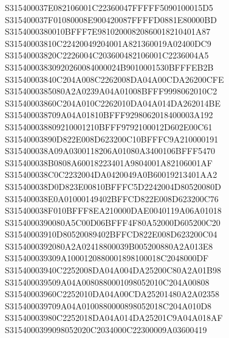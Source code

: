 \documentclass[12pt,a4paper]{article}
\begin{document}
\begin{framed}
{S315400037E082106001C22360047FFFFF5090100015D5\newline
S315400037F01080008E900420087FFFFD0881E80000BD\newline
S3154000380010BFFF7E98102000820860018210401A87\newline
S31540003810C22420049204001A821360019A02400DC9\newline
S31540003820C2226004C203600482106001C2236004A5\newline
S31540003830920260084000024B9010001530BFFFEB2B\newline
S31540003840C204A008C2262008DA04A00CDA26200CFE\newline
S3154000385080A2A0239A04A01008BFFF9998062010C2\newline
S31540003860C204A010C2262010DA04A014DA262014BE\newline
S315400038709A04A01810BFFF9298062018400003A192\newline
S315400038809210001210BFFF9792100012D602E00C61\newline
S31540003890D822E008D623200C10BFFFC9A210000191\newline
S315400038A09A0300118206A01080A3400106BFFF5470\newline
S315400038B0808A60018223401A9804001A82106001AF\newline
S315400038C0C2232004DA0420049A0B60019213401AA2\newline
S315400038D0D823E00810BFFFC5D2242004D80520080D\newline
S315400038E0A01000149402BFFCD822E008D623200C76\newline
S315400038F010BFFF8EA210000DAE0040119A06A01018\newline
S3154000390080A5C00D06BFFF4F80A52000D605200C20\newline
S31540003910D80520089402BFFCD822E008D623200C04\newline
S3154000392080A2A02418800039B005200880A2A013E8\newline
S315400039309A1000120880001898100018C2048000DF\newline
S31540003940C2252008DA04A004DA25200C80A2A01B98\newline
S315400039509A04A0080880001098052010C204A00808\newline
S31540003960C2252010DA04A00CDA25201480A2A02358\newline
S315400039709A04A0100880000898052018C204A010D8\newline
S31540003980C2252018DA04A014DA25201C9A04A018AF\newline
S3154000399098052020C2034000C22300009A03600419\newline
}
\end{framed}
\end{document}
